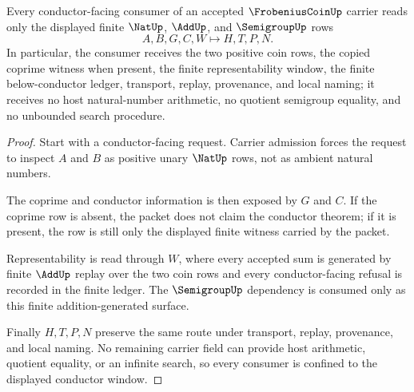 \begin{theorem}
\label{thm:frobenius-coin-conductor-window}
Every conductor-facing consumer of an accepted $\FrobeniusCoinUp$ carrier reads only the displayed finite $\NatUp$, $\AddUp$, and $\SemigroupUp$ rows
$$
A,B,G,C,W \longmapsto H,T,P,N .
$$
In particular, the consumer receives the two positive coin rows, the copied coprime witness when present, the finite representability window, the finite below-conductor ledger, transport, replay, provenance, and local naming; it receives no host natural-number arithmetic, no quotient semigroup equality, and no unbounded search procedure.
\end{theorem}
\begin{proof}
Start with a conductor-facing request. Carrier admission forces the request to inspect $A$ and $B$ as positive unary $\NatUp$ rows, not as ambient natural numbers.

The coprime and conductor information is then exposed by $G$ and $C$. If the coprime row is absent, the packet does not claim the conductor theorem; if it is present, the row is still only the displayed finite witness carried by the packet.

Representability is read through $W$, where every accepted sum is generated by finite $\AddUp$ replay over the two coin rows and every conductor-facing refusal is recorded in the finite ledger. The $\SemigroupUp$ dependency is consumed only as this finite addition-generated surface.

Finally $H,T,P,N$ preserve the same route under transport, replay, provenance, and local naming. No remaining carrier field can provide host arithmetic, quotient equality, or an infinite search, so every consumer is confined to the displayed conductor window.
\end{proof}


\begin{closurestatus}{\FrobeniusCoinUp}
  \theoryclosure{\seedClosure}
  \formalstatus{\unformalizedV}
\end{closurestatus}

